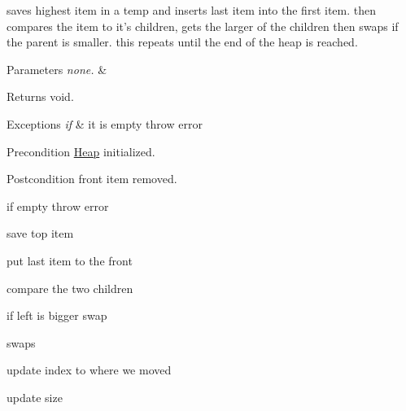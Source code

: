saves highest item in a temp and inserts last item into the first item. then compares the item to it's children, gets the larger of the children then swaps if the parent is smaller. this repeats until the end of the heap is reached. 
\begin{DoxyParams}{Parameters}
{\em none.} & \\
\hline
\end{DoxyParams}
\begin{DoxyReturn}{Returns}
void. 
\end{DoxyReturn}

\begin{DoxyExceptions}{Exceptions}
{\em if} & it is empty throw error\\
\hline
\end{DoxyExceptions}
\begin{DoxyPrecond}{Precondition}
\hyperlink{class_heap}{Heap} initialized. 
\end{DoxyPrecond}
\begin{DoxyPostcond}{Postcondition}
front item removed. 
\end{DoxyPostcond}
if empty throw error

save top item

put last item to the front

compare the two children

if left is bigger swap

swaps

update index to where we moved

update size

